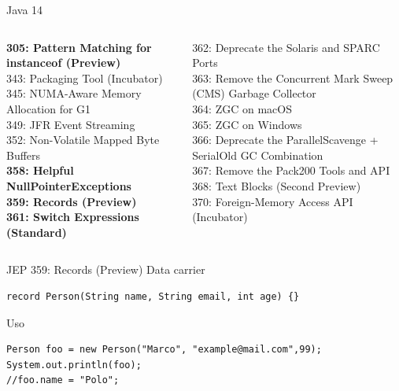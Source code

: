 \documentclass[aspectratio=169]{beamer}
\begin{document}
\begin{frame}[fragile]{Java 14}\scriptsize
    \begin{columns}[T] %
        
        \begin{column}[T]{6cm} %
            \textbf{305: Pattern Matching for instanceof (Preview)}\\
            343: Packaging Tool (Incubator)\\
            345: NUMA-Aware Memory Allocation for G1\\
            349: JFR Event Streaming\\
            352: Non-Volatile Mapped Byte Buffers\\
            \textbf{358: Helpful NullPointerExceptions}\\
            \textbf{359: Records (Preview)}\\
            \textbf{361: Switch Expressions (Standard)}
        \end{column}
        \begin{column}[T]{6cm} %
            362: Deprecate the Solaris and SPARC Ports\\
            363: Remove the Concurrent Mark Sweep (CMS) Garbage Collector\\
            364: ZGC on macOS\\
            365: ZGC on Windows\\
            366: Deprecate the ParallelScavenge + SerialOld GC Combination\\
            367: Remove the Pack200 Tools and API\\
            368: Text Blocks (Second Preview)\\
            370: Foreign-Memory Access API (Incubator)
        \end{column}
    \end{columns}
\end{frame}

\begin{frame}[fragile]{JEP 359: Records (Preview)}
Data carrier
\begin{lstlisting}
record Person(String name, String email, int age) {}
\end{lstlisting}

Uso
\begin{lstlisting}
Person foo = new Person("Marco", "example@mail.com",99);
System.out.println(foo);
//foo.name = "Polo";
\end{lstlisting}	
\end{frame}
\end{document}
